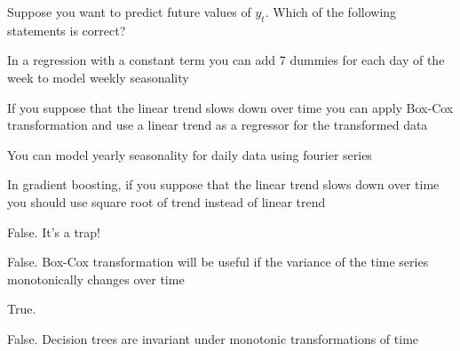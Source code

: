 
\begin{question}
Suppose you want to predict future values of \(y_t\). Which of the following statements is correct?
\begin{answerlist}
  \item In a regression with a constant term you can add 7 dummies for each day of the week to model weekly seasonality
  \item If you suppose that the linear trend slows down over time you can apply Box-Cox transformation and use a linear trend as a regressor for the transformed data
  \item You can model yearly seasonality for daily data using fourier series
  \item In gradient boosting, if you suppose that the linear trend slows down over time you should use square root of trend instead of linear trend
\end{answerlist}
\end{question}

\begin{solution}
\begin{answerlist}
  \item False. It's a trap!
  \item False. Box-Cox transformation will be useful if the variance of the time series monotonically changes over time
  \item True.
  \item False. Decision trees are invariant under monotonic transformations of time
\end{answerlist}
\end{solution}

